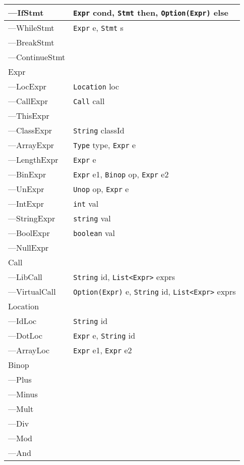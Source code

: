 \documentclass{article}
\begin{document}
\begin{longtable}{p{} | p{}}
    ---IfStmt & \texttt{Expr} cond, \texttt{Stmt} then, \texttt{Option(Expr)} else \\\hline
    ---WhileStmt & \texttt{Expr} e, \texttt{Stmt} s \\\hline
    ---BreakStmt & \\\hline
    ---ContinueStmt & \\\hline
    Expr & \\\hline
    ---LocExpr & \texttt{Location} loc \\\hline
    ---CallExpr & \texttt{Call} call \\\hline
    ---ThisExpr & \\\hline
    ---ClassExpr & \texttt{String} classId \\\hline
    ---ArrayExpr & \texttt{Type} type, \texttt{Expr} e \\\hline
    ---LengthExpr & \texttt{Expr} e \\\hline
    ---BinExpr & \texttt{Expr} e1, \texttt{Binop} op, \texttt{Expr} e2 \\\hline
    ---UnExpr & \texttt{Unop} op, \texttt{Expr} e \\\hline
    ---IntExpr & \texttt{int} val \\\hline
    ---StringExpr & \texttt{string} val \\\hline
    ---BoolExpr & \texttt{boolean} val \\\hline
    ---NullExpr & \\\hline
    Call & \\\hline
    ---LibCall & \texttt{String} id, \texttt{List<Expr>} exprs \\\hline
    ---VirtualCall & \texttt{Option(Expr)} e, \texttt{String} id, \texttt{List<Expr>} exprs \\\hline
    Location & \\\hline
    ---IdLoc & \texttt{String} id \\\hline
    ---DotLoc & \texttt{Expr} e, \texttt{String} id \\\hline
    ---ArrayLoc & \texttt{Expr} e1, \texttt{Expr} e2 \\\hline
    Binop & \\\hline
    ---Plus & \\\hline
    ---Minus &  \\\hline
    ---Mult & \\\hline
    ---Div & \\\hline
    ---Mod & \\\hline
    ---And & \\\hline

\end{longtable}
\end{document}
